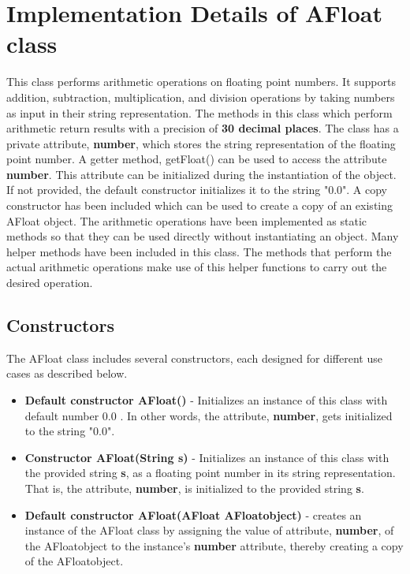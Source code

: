 \documentclass[a4paper,12pt]{article}
\begin{document}
{\section{Implementation Details of AFloat class}
This class performs arithmetic operations on floating point numbers. It supports addition, subtraction, multiplication, and division operations by taking numbers as input in their string representation. The methods in this class which perform arithmetic return results with a precision of \textbf{30 decimal places}. The class has a private attribute, \textbf{number}, which stores the string representation of the floating point number. A getter method, getFloat() can be used to access the attribute \textbf{number}. This attribute can be initialized during the instantiation of the object. If not provided, the default constructor initializes it to the string "$0.0$". A copy constructor has been included which can be used to create a copy of an existing AFloat object. The arithmetic operations have been implemented as static methods so that they can be used directly without instantiating an object. Many helper methods have been included in this class. The methods that perform the actual arithmetic operations make use of this helper functions to carry out the desired operation.

\subsection{Constructors}
The AFloat class includes several constructors, each designed for different use cases as described below.

\begin{itemize}
    \item \textbf{Default constructor AFloat()} - Initializes an instance of this class with default number $0.0$ . In other words, the attribute, \textbf{number}, gets initialized to the string "$0.0$".
    \item \textbf{Constructor AFloat(String s)} - Initializes an instance of this class with the provided string \textbf{s}, as a floating point number in its string representation. That is, the attribute, \textbf{number}, is initialized to the provided string \textbf{s}.
    \item \textbf{Default constructor AFloat(AFloat AFloatobject)} - creates an instance of the AFloat class by assigning the value of attribute, \textbf{number}, of the AFloatobject to the instance's \textbf{number} attribute, thereby creating a copy of the AFloatobject.
\end{itemize}

}
\end{document}
